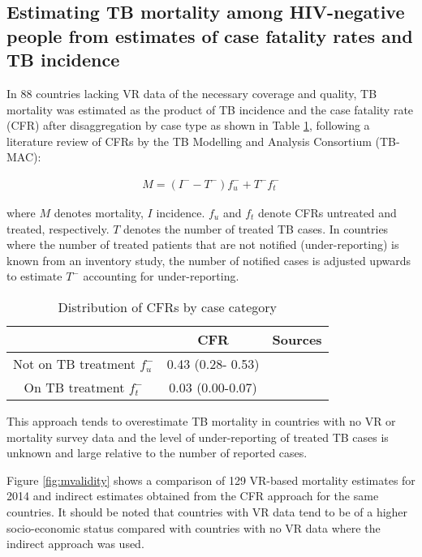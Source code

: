 \subsection{Estimating TB mortality among HIV-negative people from estimates of case fatality rates and TB incidence
}

In 88 countries lacking VR data of the necessary coverage and quality, TB mortality was estimated as the product of TB incidence and the case fatality rate (CFR) after disaggregation by case type as shown in Table \ref{tab:cfr}, following a literature review of CFRs by the TB Modelling and Analysis Consortium (TB-MAC):

\begin{align*}
M = (I^- -T^-)f^-_u + T^-f^-_t 
\end{align*}

where $M$ denotes mortality, $I$ incidence. $f_u$ and $f_t$ denote CFRs untreated and treated, respectively. $T$ denotes the number of treated TB cases. In countries where the number of treated patients that are not notified (under-reporting) is known from an inventory study, the number of notified cases is adjusted upwards to estimate $T^-$ accounting for under-reporting. 

\begin{table} 
    \begin{tabular}{ c c c }
    \hline
         & CFR & Sources \\ 
         \hline
        Not on TB treatment $f^-_u$ & 0.43 (0.28- 0.53) &  \cite{12742798} \cite{21483732} \\ 
        On TB treatment $f^-_t$ & 0.03 (0.00-0.07) &  \cite{21738585} \\ 
        \hline
    \end{tabular} 
    \caption{Distribution of CFRs by case category} 
    \label{tab:cfr}
\end{table}

This approach tends to overestimate TB mortality in countries with no VR or mortality survey data and the level of under-reporting of treated TB cases is unknown and large relative to the number of reported cases. 

Figure \ref{fig:mvalidity} shows a comparison of 129 VR-based mortality estimates for 2014 and indirect estimates obtained from the CFR approach for the same countries. It should be noted that countries with VR data tend to be of a higher socio-economic status compared with countries with no VR data where the indirect approach was used.


